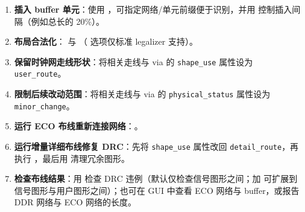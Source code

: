 \begin{enumerate}
  \item \textbf{插入 buffer 单元}：使用 ，可指定网络/单元前缀便于识别，并用  控制插入间隔（例如总长的 20\%）。
  \item \textbf{布局合法化}： 与 （ 选项仅标准 legalizer 支持）。
  \item \textbf{保留时钟网走线形状}：将相关走线与 via 的 \texttt{shape\_use} 属性设为 \texttt{user\_route}。
  \item \textbf{限制后续改动范围}：将相关走线与 via 的 \texttt{physical\_status} 属性设为 \texttt{minor\_change}。
  \item \textbf{运行 ECO 布线重新连接网络}：。
  \item \textbf{运行增量详细布线修复 DRC}：先将 \texttt{shape\_use} 属性改回 \texttt{detail\_route}，再执行 ，最后用  清理冗余图形。
  \item \textbf{检查布线结果}：用  检查 DRC 违例（默认仅检查信号图形之间；加  可扩展到信号图形与用户图形之间）；也可在 GUI 中查看 ECO 网络与 buffer，或报告 DDR 网络与 ECO 网络的长度。
\end{enumerate}
